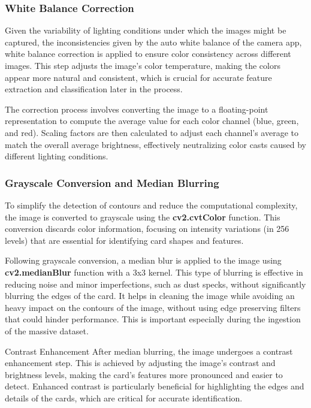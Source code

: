 \documentclass[twocolumn, a4paper,10pt]{article}
\begin{document}
\subsubsection*{White Balance Correction}
Given the variability of lighting conditions under which the images might be captured, the inconsistencies given by the auto white balance of the camera app, white balance correction is applied to ensure color consistency across different images. This step adjusts the image's color temperature, making the colors appear more natural and consistent, which is crucial for accurate feature extraction and classification later in the process.

The correction process involves converting the image to a floating-point representation to compute the average value for each color channel (blue, green, and red). Scaling factors are then calculated to adjust each channel's average to match the overall average brightness, effectively neutralizing color casts caused by different lighting conditions.

\subsubsection*{Grayscale Conversion and Median Blurring}

To simplify the detection of contours and reduce the computational complexity, the image is converted to grayscale using the \textbf{cv2.cvtColor} function. This conversion discards color information, focusing on intensity variations (in 256 levels) that are essential for identifying card shapes and features.

Following grayscale conversion, a median blur is applied to the image using \textbf{cv2.medianBlur} function with a 3x3 kernel. This type of blurring is effective in reducing noise and minor imperfections, such as dust specks, without significantly blurring the edges of the card. It helps in cleaning the image while avoiding an heavy impact on the contours of the image, without using edge preserving filters that could hinder performance. This is important especially during the ingestion of the massive dataset.

Contrast Enhancement
After median blurring, the image undergoes a contrast enhancement step. This is achieved by adjusting the image's contrast and brightness levels, making the card's features more pronounced and easier to detect. Enhanced contrast is particularly beneficial for highlighting the edges and details of the cards, which are critical for accurate identification.
\end{document}
